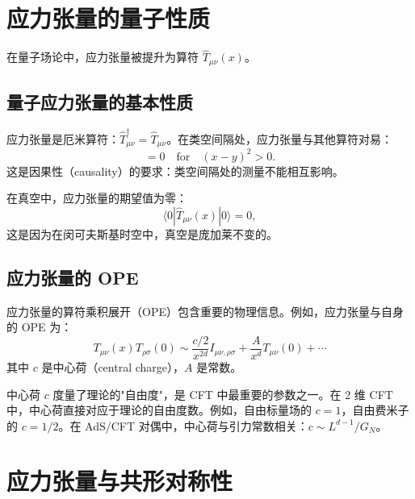 \section{应力张量的量子性质}

在量子场论中，应力张量被提升为算符 $\hat{T}_{\mu\nu}(x)$。

\subsection{量子应力张量的基本性质}

\begin{property}[量子应力张量的性质]
应力张量是厄米算符：$\hat{T}_{\mu\nu}^\dagger = \hat{T}_{\mu\nu}$。在类空间隔处，应力张量与其他算符对易：
\begin{equation}
    [\hat{T}_{\mu\nu}(x), \hat{T}_{\rho\sigma}(y)] = 0 \quad \text{for} \quad (x-y)^2 > 0.
\end{equation}
这是因果性（causality）的要求：类空间隔处的测量不能相互影响。
\end{property}

在真空中，应力张量的期望值为零：
\begin{equation}
    \langle 0 | \hat{T}_{\mu\nu}(x) | 0 \rangle = 0,
\end{equation}
这是因为在闵可夫斯基时空中，真空是庞加莱不变的。

\subsection{应力张量的 OPE}

应力张量的算符乘积展开（OPE）包含重要的物理信息。例如，应力张量与自身的 OPE 为：
\begin{equation}
    T_{\mu\nu}(x) T_{\rho\sigma}(0) \sim \frac{c/2}{x^{2d}} I_{\mu\nu,\rho\sigma} + \frac{A}{x^{d}} T_{\mu\nu}(0) + \cdots
\end{equation}
其中 $c$ 是中心荷（central charge），$A$ 是常数。

\begin{note}[中心荷的物理意义]
中心荷 $c$ 度量了理论的"自由度"，是 CFT 中最重要的参数之一。在 2 维 CFT 中，中心荷直接对应于理论的自由度数。例如，自由标量场的 $c = 1$，自由费米子的 $c = 1/2$。在 AdS/CFT 对偶中，中心荷与引力常数相关：$c \sim L^{d-1}/G_N$。
\end{note}

\section{应力张量与共形对称性}


